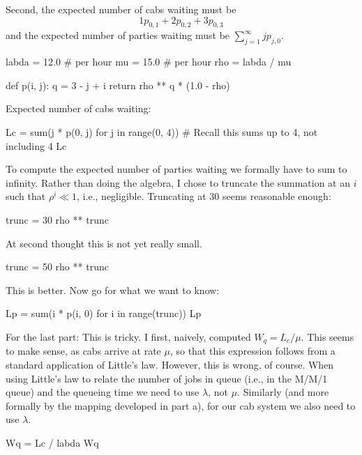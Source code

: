 \documentclass[companion]{subfiles}
\begin{document}
\begin{exercise}[Hall 5.22]
\begin{solution}
Second, the expected number of cabs waiting must be 
\begin{equation*}
1p_{0,1} + 2 p_{0,2} + 3p_{0,3}
\end{equation*}
and the expected number of parties waiting must be $\sum_{j=1}^\infty j p_{j,0}$.

\begin{pyconsole}
labda = 12.0  # per hour
mu = 15.0  # per hour
rho = labda / mu


def p(i, j):
    q = 3 - j + i
    return rho ** q * (1.0 - rho)

\end{pyconsole}
Expected number of cabs waiting:
\begin{pyconsole}
Lc = sum(j * p(0, j) for j in range(0, 4))
# Recall this sums up to 4, not including 4
Lc
\end{pyconsole}


To compute the expected number of parties waiting we formally have to
sum to infinity. Rather than doing the algebra, I chose to truncate
the summation at an $i$ such that $\rho^i \ll 1$, i.e.,
negligible. Truncating at 30 seems reasonable enough:

\begin{pyconsole}
trunc = 30
rho ** trunc
\end{pyconsole}

At second thought this is not yet really small. 

\begin{pyconsole}
trunc = 50
rho ** trunc
\end{pyconsole}


This is better. Now go for what we want to know:

\begin{pyconsole}
Lp = sum(i * p(i, 0) for i in range(trunc))
Lp
\end{pyconsole}

For the last part: This is tricky. I first, naively, computed $W_q = L_c/\mu$. This
seems to make sense, as cabs arrive at rate $\mu$, so that this
expression follows from a standard application of Little's
law. However, this is wrong, of course. When using Little's law to
relate the number of jobs in queue (i.e., in the M/M/1 queue) and the
queueing time we need to use $\lambda$, not
$\mu$. Similarly (and more formally by the mapping developed in
part a), for our cab system we also need to use $\lambda$.

\begin{pyconsole}
Wq = Lc / labda
Wq
\end{pyconsole}


\end{solution}
\end{exercise}
\end{document}
